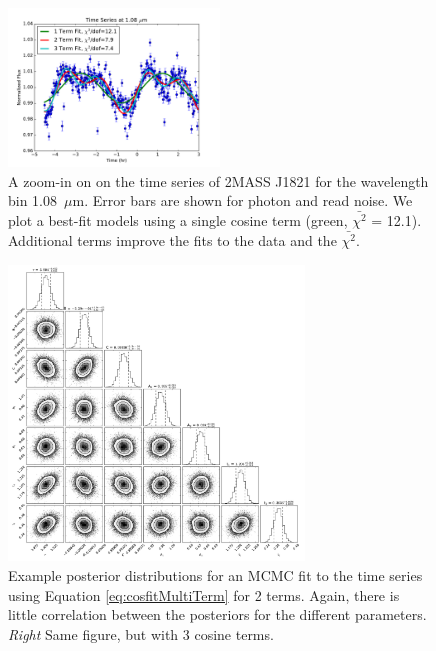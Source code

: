 \documentclass[manuscript]{aastex6}
\begin{document}
\begin{figure}
\begin{centering}
\includegraphics[width=0.5\textwidth]{best_fit_multi_terms.pdf}
\caption{A zoom-in on on the time series of 2MASS J1821 for the wavelength bin 1.08~$\mu$m. Error bars are shown for photon and read noise. We plot a best-fit models using a single cosine term (green, $\bar{\chi^2}$ = 12.1). Additional terms improve the fits to the data and the $\bar{\chi^2}$.}\label{fig:model2Cosfit}
\end{centering}
\end{figure}


\begin{figure}
\begin{centering}
\includegraphics[width=0.7\textwidth]{corner_fit_2term.pdf}
\caption{Example posterior distributions for an MCMC fit to the time series using Equation \ref{eq:cosfitMultiTerm} for 2 terms.
Again, there is little correlation between the posteriors for the different parameters. {\it Right} Same figure, but with 3 cosine terms.}\label{fig:post2Cosfit}
\end{centering}
\end{figure}
\end{document}
